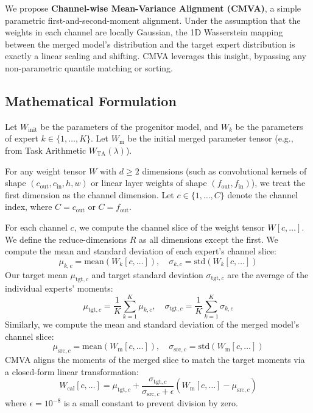 \documentclass{article}
\theoremstyle{plain}
\theoremstyle{definition}
\theoremstyle{remark}
\begin{document}
We propose \textbf{Channel-wise Mean-Variance Alignment (CMVA)}, a simple parametric first-and-second-moment alignment. Under the assumption that the weights in each channel are locally Gaussian, the 1D Wasserstein mapping between the merged model's distribution and the target expert distribution is exactly a linear scaling and shifting. CMVA leverages this insight, bypassing any non-parametric quantile matching or sorting.

\subsection{Mathematical Formulation}

Let $W_{\text{init}}$ be the parameters of the progenitor model, and $W_k$ be the parameters of expert $k \in \{1, \dots, K\}$. Let $W_{\text{m}}$ be the initial merged parameter tensor (e.g., from Task Arithmetic $W_{\text{TA}}(\lambda)$).

For any weight tensor $W$ with $d \ge 2$ dimensions (such as convolutional kernels of shape $(c_{\text{out}}, c_{\text{in}}, h, w)$ or linear layer weights of shape $(f_{\text{out}}, f_{\text{in}})$), we treat the first dimension as the channel dimension. Let $c \in \{1, \dots, C\}$ denote the channel index, where $C = c_{\text{out}}$ or $C = f_{\text{out}}$.

For each channel $c$, we compute the channel slice of the weight tensor $W[c, \dots]$. We define the reduce-dimensions $R$ as all dimensions except the first. We compute the mean and standard deviation of each expert's channel slice:
\begin{equation}
  \mu_{k, c} = \text{mean}(W_k[c, \dots]), \quad \sigma_{k, c} = \text{std}(W_k[c, \dots])
\end{equation}
Our target mean $\mu_{\text{tgt}, c}$ and target standard deviation $\sigma_{\text{tgt}, c}$ are the average of the individual experts' moments:
\begin{equation}
  \mu_{\text{tgt}, c} = \frac{1}{K} \sum_{k=1}^K \mu_{k, c}, \quad \sigma_{\text{tgt}, c} = \frac{1}{K} \sum_{k=1}^K \sigma_{k, c}
\end{equation}
Similarly, we compute the mean and standard deviation of the merged model's channel slice:
\begin{equation}
  \mu_{\text{src}, c} = \text{mean}(W_{\text{m}}[c, \dots]), \quad \sigma_{\text{src}, c} = \text{std}(W_{\text{m}}[c, \dots])
\end{equation}
CMVA aligns the moments of the merged slice to match the target moments via a closed-form linear transformation:
\begin{equation}
  W_{\text{cal}}[c, \dots] = \mu_{\text{tgt}, c} + \frac{\sigma_{\text{tgt}, c}}{\sigma_{\text{src}, c} + \epsilon} (W_{\text{m}}[c, \dots] - \mu_{\text{src}, c})
\end{equation}
where $\epsilon = 10^{-8}$ is a small constant to prevent division by zero.
\end{document}
